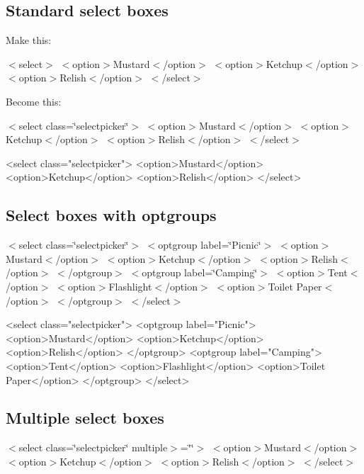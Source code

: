 

 \subsection*{Standard select boxes}

 

Make this\+:



 $<$select$>$ $<$option$>$Mustard$<$/option$>$ $<$option$>$Ketchup$<$/option$>$ $<$option$>$Relish$<$/option$>$ $<$/select$>$

 

Become this\+:



 $<$select class=\char`\"{}selectpicker\char`\"{}$>$ $<$option$>$Mustard$<$/option$>$ $<$option$>$Ketchup$<$/option$>$ $<$option$>$Relish$<$/option$>$ $<$/select$>$ 


\begin{DoxyCode}
<select class="selectpicker">
  <option>Mustard</option>
  <option>Ketchup</option>
  <option>Relish</option>
</select>
\end{DoxyCode}


 \subsection*{Select boxes with optgroups}

 $<$select class=\char`\"{}selectpicker\char`\"{}$>$ $<$optgroup label=\char`\"{}\+Picnic\char`\"{}$>$ $<$option$>$Mustard$<$/option$>$ $<$option$>$Ketchup$<$/option$>$ $<$option$>$Relish$<$/option$>$ $<$/optgroup$>$ $<$optgroup label=\char`\"{}\+Camping\char`\"{}$>$ $<$option$>$Tent$<$/option$>$ $<$option$>$Flashlight$<$/option$>$ $<$option$>$Toilet Paper$<$/option$>$ $<$/optgroup$>$ $<$/select$>$ 


\begin{DoxyCode}
<select class="selectpicker">
  <optgroup label="Picnic">
    <option>Mustard</option>
    <option>Ketchup</option>
    <option>Relish</option>
  </optgroup>
  <optgroup label="Camping">
    <option>Tent</option>
    <option>Flashlight</option>
    <option>Toilet Paper</option>
  </optgroup>
</select>
\end{DoxyCode}


\subsection*{Multiple select boxes}

 $<$select class=\char`\"{}selectpicker\char`\"{} multiple$>$=\char`\"{}\char`\"{}$>$ $<$option$>$Mustard$<$/option$>$ $<$option$>$Ketchup$<$/option$>$ $<$option$>$Relish$<$/option$>$ $<$/select$>$ 


